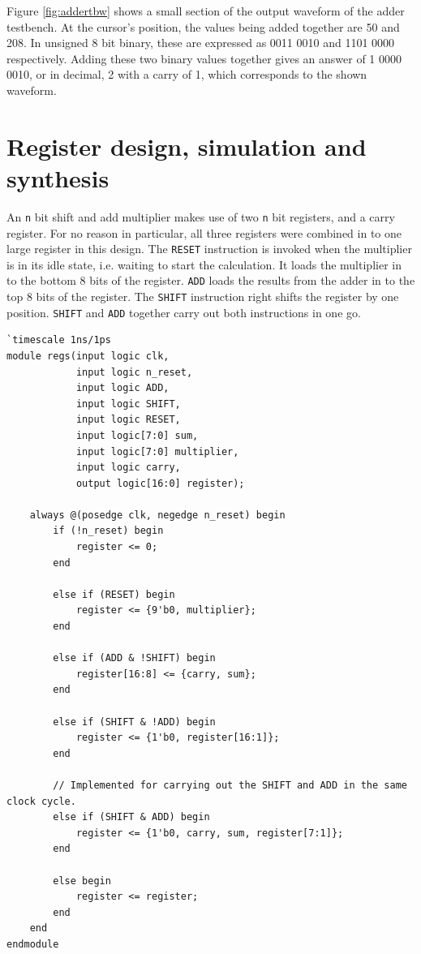\documentclass[a4paper,11pt]{article}
\begin{document}
Figure \ref{fig:addertbw} shows a small section of the output waveform of the adder testbench. At the cursor's position, the values being added together are 50 and 208. In unsigned 8 bit binary, these are expressed as 0011 0010 and 1101 0000 respectively. Adding these two binary values together gives an answer of 1 0000 0010, or in decimal, 2 with a carry of 1, which corresponds to the shown waveform.

\section{Register design, simulation and synthesis}
An \lstinline{n} bit shift and add multiplier makes use of two \lstinline{n} bit registers, and a carry register. For no reason in particular, all three registers were combined in to one large register in this design. The \lstinline{RESET} instruction is invoked when the multiplier is in its idle state, i.e. waiting to start the calculation. It loads the multiplier in to the bottom 8 bits of the register. \lstinline{ADD} loads the results from the adder in to the top 8 bits of the register. The \lstinline{SHIFT} instruction right shifts the register by one position. \lstinline{SHIFT} and \lstinline{ADD} together carry out both instructions in one go.

\begin{lstlisting}
`timescale 1ns/1ps
module regs(input logic clk, 
            input logic n_reset,
            input logic ADD,
            input logic SHIFT,
            input logic RESET,
            input logic[7:0] sum,
            input logic[7:0] multiplier,
            input logic carry,
            output logic[16:0] register);

    always @(posedge clk, negedge n_reset) begin
        if (!n_reset) begin
            register <= 0;
        end
        
        else if (RESET) begin
            register <= {9'b0, multiplier};
        end
            
        else if (ADD & !SHIFT) begin
            register[16:8] <= {carry, sum};
        end
            
        else if (SHIFT & !ADD) begin
            register <= {1'b0, register[16:1]};
        end
		
        // Implemented for carrying out the SHIFT and ADD in the same clock cycle.
        else if (SHIFT & ADD) begin
            register <= {1'b0, carry, sum, register[7:1]};
        end
        
        else begin
            register <= register;
        end
    end
endmodule
\end{lstlisting}
\end{document}
